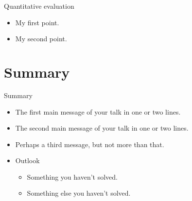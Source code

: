 \documentclass{beamer}
\begin{document}
\begin{frame}{Quantitative evaluation }
  \begin{itemize}
  \item {
    My first point.
  }
  \item {
    My second point.
  }
  \end{itemize}
\end{frame}


\section*{Summary}

\begin{frame}{Summary}
  \begin{itemize}
  \item
    The \alert{first main message} of your talk in one or two lines.
  \item
    The \alert{second main message} of your talk in one or two lines.
  \item
    Perhaps a \alert{third message}, but not more than that.
  \end{itemize}
  
  \begin{itemize}
  \item
    Outlook
    \begin{itemize}
    \item
      Something you haven't solved.
    \item
      Something else you haven't solved.
    \end{itemize}
  \end{itemize}
\end{frame}
\end{document}
